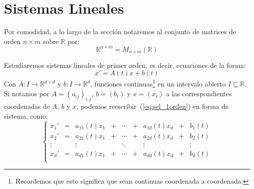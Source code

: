\newpage
\chapter{Sistemas Lineales}

\begin{notacion}
    Por comodidad, a lo largo de la sección notaremos al conjunto de matrices de orden $n\times m$ sobre $\mathbb{R}$ por:
    \begin{equation*}
        \mathbb{R}^{n\times m} = M_{n\times m}(\mathbb{R})
    \end{equation*}
\end{notacion}

\noindent
Estudiaremos sistemas lineales de primer orden, es decir, ecuaciones de la forma:
\begin{equation}\label{eq:sel_1orden}
    x' = A(t) x + b(t)
\end{equation}
Con $A:I\rightarrow\mathbb{R}^{d\times d}$ y $b:I\rightarrow\mathbb{R}^d$, funciones continuas\footnote{Recordemos que esto significa que sean continuas coordenada a coordenada.} en un intervalo abierto $I\subseteq \mathbb{R}$. Si notamos por $A = {(a_{ij})}_{i,j}$, $b = (b_i)$ y $x = (x_i)$ a las correspondientes coordenadas de $A$, $b$ y $x$, podemos reescribir~(\ref{eq:sel_1orden}) en forma de sistema, como:
\begin{equation}\label{eq:sistema_1orden}
    \left\{\begin{array}{ccccccccc}
            x_1' & = & a_{11}(t)x_1 & + & \cdots & + & a_{1d}(t)x_d & + & b_1(t) \\
            x_2' & = & a_{21}(t)x_1 & + & \cdots & + & a_{2d}(t)x_d & + & b_2(t) \\
            \vdots & & \vdots & & \ddots & & \vdots & & \vdots \\
            x_d' & = & a_{d1}(t)x_1 & + & \cdots & + & a_{dd}(t)x_d & + & b_d(t) \\
    \end{array}\right.
\end{equation}

